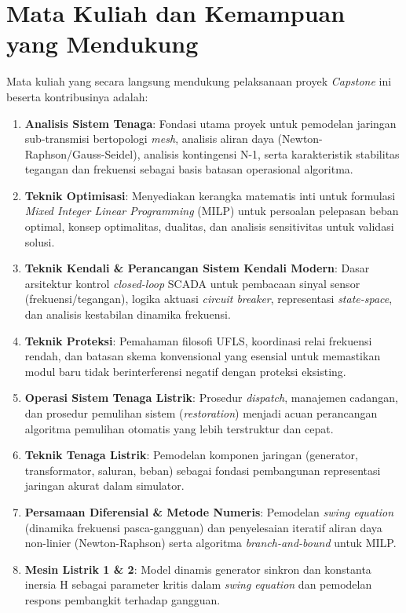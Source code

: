 \section{Mata Kuliah dan Kemampuan yang Mendukung}
\label{sec:Mata_Kuliah_dan_Kemampuan_yang_Mendukung}

Mata kuliah yang secara langsung mendukung pelaksanaan proyek \textit{Capstone} ini beserta kontribusinya adalah:

\begin{enumerate}
\item[a.] \textbf{Analisis Sistem Tenaga}: Fondasi utama proyek untuk pemodelan jaringan sub-transmisi bertopologi \textit{mesh}, analisis aliran daya (Newton-Raphson/Gauss-Seidel), analisis kontingensi N-1, serta karakteristik stabilitas tegangan dan frekuensi sebagai basis batasan operasional algoritma.
    \item[b.] \textbf{Teknik Optimisasi}: Menyediakan kerangka matematis inti untuk formulasi \textit{Mixed Integer Linear Programming} (MILP) untuk persoalan pelepasan beban optimal, konsep optimalitas, dualitas, dan analisis sensitivitas untuk validasi solusi.
    \item[c.] \textbf{Teknik Kendali \& Perancangan Sistem Kendali Modern}: Dasar arsitektur kontrol \textit{closed-loop} SCADA untuk pembacaan sinyal sensor (frekuensi/tegangan), logika aktuasi \textit{circuit breaker}, representasi \textit{state-space}, dan analisis kestabilan dinamika frekuensi.
    \item[d.] \textbf{Teknik Proteksi}: Pemahaman filosofi UFLS, koordinasi relai frekuensi rendah, dan batasan skema konvensional yang esensial untuk memastikan modul baru tidak berinterferensi negatif dengan proteksi eksisting.
    \item[e.] \textbf{Operasi Sistem Tenaga Listrik}: Prosedur \textit{dispatch}, manajemen cadangan, dan prosedur pemulihan sistem (\textit{restoration}) menjadi acuan perancangan algoritma pemulihan otomatis yang lebih terstruktur dan cepat.
    \item[f.] \textbf{Teknik Tenaga Listrik}: Pemodelan komponen jaringan (generator, transformator, saluran, beban) sebagai fondasi pembangunan representasi jaringan akurat dalam simulator.
    \item[g.] \textbf{Persamaan Diferensial \& Metode Numeris}: Pemodelan \textit{swing equation} (dinamika frekuensi pasca-gangguan) dan penyelesaian iteratif aliran daya non-linier (Newton-Raphson) serta algoritma \textit{branch-and-bound} untuk MILP.
    \item[h.] \textbf{Mesin Listrik 1 \& 2}: Model dinamis generator sinkron dan konstanta inersia H sebagai parameter kritis dalam \textit{swing equation} dan pemodelan respons pembangkit terhadap gangguan.

\end{enumerate}
